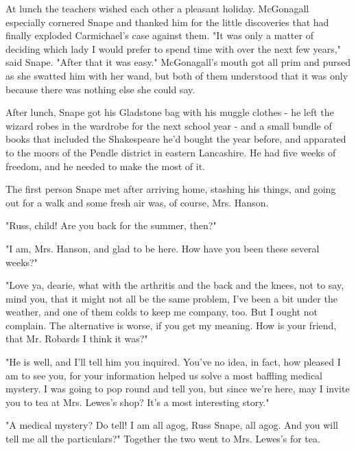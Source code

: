 \documentclass[a4paper,11pt]{article}
\begin{document}
At lunch the teachers wished each other a pleasant holiday. McGonagall especially cornered Snape and thanked him for the little discoveries that had finally exploded Carmichael's case against them. "It was only a matter of deciding which lady I would prefer to spend time with over the next few years," said Snape. "After that it was easy." McGonagall's mouth got all prim and pursed as she swatted him with her wand, but both of them understood that it was only because there was nothing else she could say.

After lunch, Snape got his Gladstone bag with his muggle clothes - he left the wizard robes in the wardrobe for the next school year - and a small bundle of books that included the Shakespeare he'd bought the year before, and apparated to the moors of the Pendle district in eastern Lancashire. He had five weeks of freedom, and he needed to make the most of it.

The first person Snape met after arriving home, stashing his things, and going out for a walk and some fresh air was, of course, Mrs. Hanson.

"Russ, child! Are you back for the summer, then?"

"I am, Mrs. Hanson, and glad to be here. How have you been these several weeks?"

"Love ya, dearie, what with the arthritis and the back and the knees, not to say, mind you, that it might not all be the same problem, I've been a bit under the weather, and one of them colds to keep me company, too. But I ought not complain. The alternative is worse, if you get my meaning. How is your friend, that Mr. Robards I think it was?"

"He is well, and I'll tell him you inquired. You've no idea, in fact, how pleased I am to see you, for your information helped us solve a most baffling medical mystery. I was going to pop round and tell you, but since we're here, may I invite you to tea at Mrs. Lewes's shop? It's a most interesting story."

"A medical mystery? Do tell! I am all agog, Russ Snape, all agog. And you will tell me all the particulars?" Together the two went to Mrs. Lewes's for tea.
\end{document}
